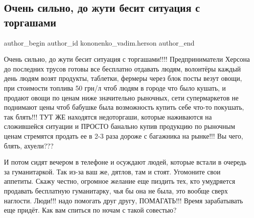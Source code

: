  
 
 
 
 
 
\subsection{Очень сильно, до жути бесит ситуация с торгашами}
\label{sec:14_04_2022.fb.kononenko_vadim.herson.1.torgashi}
 
\ifcmt
 author_begin
   author_id kononenko_vadim.herson
 author_end
\fi

Очень сильно, до жути бесит ситуация с торгашами!!!! Предприниматели Херсона до
последних трусов готовы все бесплатно отдавать людям, волонтёры каждый день
людям возят продукты, таблетки, фермеры через блок посты везут овощи, при
стоимости топлива 50 грн/л чтоб людям в городе что было кушать, и продают овощи
по  ценам ниже значительно рыночных, сети супермаркетов не поднимают цены чтоб
бабушке была возможность купить себе что-то покушать, так блять!!! ТУТ ЖЕ
находятся недоторгаши, которые  наживаются на сложившейся ситуации и ПРОСТО
банально купив продукцию по рыночным ценам стремятся продать ее в 2-3 раза
дороже с багажника на рынке!!! Вы чего, блять, ахуели???

И потом сидят вечером в телефоне и осуждают людей, которые встали в очередь за
гуманитаркой. Так из-за ваш же, дятлов, там и стоят. Угомоните свои аппетиты.
Скажу честно, огромное желание еще пиздить тех, кто умудряется продавать
бесплатную гуманитарку, чья бы она не была, это вообще сверх наглости. Люди!!!
надо помогать друг другу, ПОМАГАТЬ!!! Время зарабатывать еще придёт. Как вам
спиться по ночам с такой совестью?

